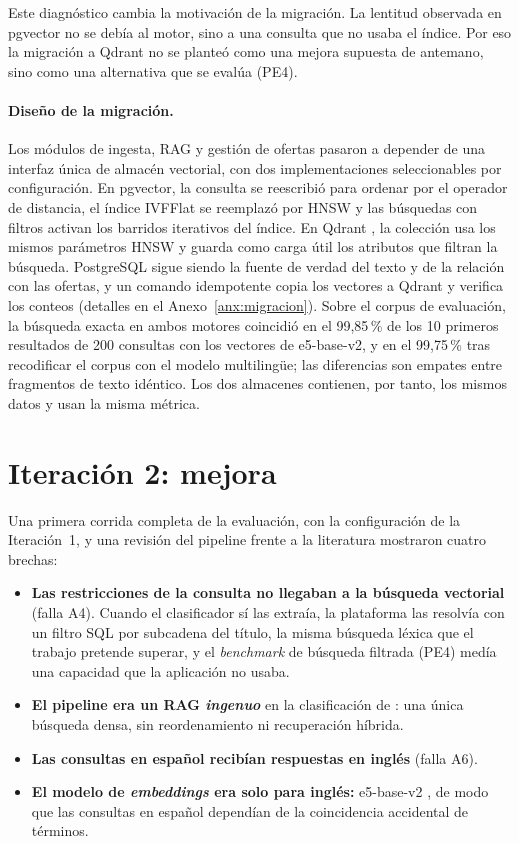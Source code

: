 Este diagnóstico cambia la motivación de la migración. La lentitud observada en pgvector no se debía al motor, sino a una consulta que no usaba el índice. Por eso la migración a Qdrant no se planteó como una mejora supuesta de antemano, sino como una alternativa que se evalúa (PE4).

\paragraph{Diseño de la migración.} Los módulos de ingesta, RAG y gestión de ofertas pasaron a depender de una interfaz única de almacén vectorial, con dos implementaciones seleccionables por configuración. En pgvector, la consulta se reescribió para ordenar por el operador de distancia, el índice IVFFlat se reemplazó por HNSW \citep{Malkov2020} y las búsquedas con filtros activan los barridos iterativos del índice. En Qdrant \citep{QdrantDocs}, la colección usa los mismos parámetros HNSW y guarda como carga útil los atributos que filtran la búsqueda. PostgreSQL sigue siendo la fuente de verdad del texto y de la relación con las ofertas, y un comando idempotente copia los vectores a Qdrant y verifica los conteos (detalles en el Anexo~\ref{anx:migracion}). Sobre el corpus de evaluación, la búsqueda exacta en ambos motores coincidió en el 99,85\,\% de los 10 primeros resultados de 200 consultas con los vectores de e5-base-v2, y en el 99,75\,\% tras recodificar el corpus con el modelo multilingüe; las diferencias son empates entre fragmentos de texto idéntico. Los dos almacenes contienen, por tanto, los mismos datos y usan la misma métrica.

\section{Iteración 2: mejora}
\label{sec:art-iter-recuperacion}

Una primera corrida completa de la evaluación, con la configuración de la Iteración~1, y una revisión del pipeline frente a la literatura mostraron cuatro brechas:
\begin{itemize}
    \item \textbf{Las restricciones de la consulta no llegaban a la búsqueda vectorial} (falla A4). Cuando el clasificador sí las extraía, la plataforma las resolvía con un filtro SQL por subcadena del título, la misma búsqueda léxica que el trabajo pretende superar, y el \textit{benchmark} de búsqueda filtrada (PE4) medía una capacidad que la aplicación no usaba.
    \item \textbf{El pipeline era un RAG \emph{ingenuo}} en la clasificación de \citet{Gao2023}: una única búsqueda densa, sin reordenamiento ni recuperación híbrida.
    \item \textbf{Las consultas en español recibían respuestas en inglés} (falla A6).
    \item \textbf{El modelo de \textit{embeddings} era solo para inglés:} e5-base-v2 \citep{Wang2022E5}, de modo que las consultas en español dependían de la coincidencia accidental de términos.
\end{itemize}

